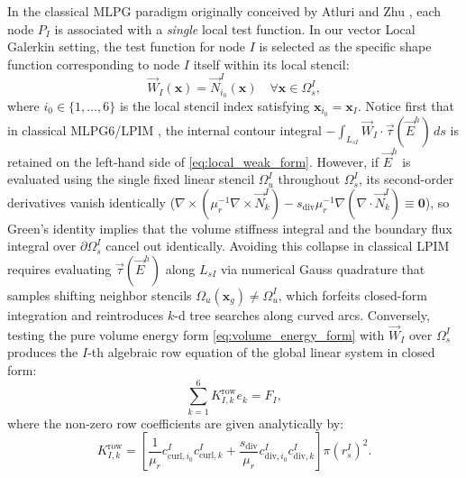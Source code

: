 \documentclass[VANCOUVER,Times1COL]{WileyNJD-v5}
\begin{document}
In the classical MLPG paradigm originally conceived by Atluri and Zhu \cite{atluri1998new, atluri2002meshless}, each node $P_I$ is associated with a \textit{single} local test function. In our vector Local Galerkin setting, the test function for node $I$ is selected as the specific shape function corresponding to node $I$ itself within its local stencil:
\begin{equation}
    \vec{W}_I(\mathbf{x}) = \vec{N}_{i_0}^I(\mathbf{x}) \quad \forall \mathbf{x} \in \Omega_s^I,
    \label{eq:test_function_row}
\end{equation}
where $i_0 \in \{1, \dots, 6\}$ is the local stencil index satisfying $\mathbf{x}_{i_0} = \mathbf{x}_I$. Notice first that in classical MLPG6/LPIM \cite{atluri2002meshless, liu2001local}, the internal contour integral $-\int_{L_{sI}} \vec{W}_I \cdot \vec{\tau}(\vec{E}^h) \, ds$ is retained on the left-hand side of \eqref{eq:local_weak_form}. However, if $\vec{E}^h$ is evaluated using the single fixed linear stencil $\Omega_u^I$ throughout $\Omega_s^I$, its second-order derivatives vanish identically ($\nabla \times (\mu_r^{-1}\nabla \times \vec{N}_k^I) - s_{\mathrm{div}}\mu_r^{-1}\nabla(\nabla \cdot \vec{N}_k^I) \equiv \mathbf{0}$), so Green's identity implies that the volume stiffness integral and the boundary flux integral over $\partial\Omega_s^I$ cancel out identically. Avoiding this collapse in classical LPIM requires evaluating $\vec{\tau}(\vec{E}^h)$ along $L_{sI}$ via numerical Gauss quadrature that samples shifting neighbor stencils $\Omega_u(\mathbf{x}_g) \ne \Omega_u^I$, which forfeits closed-form integration and reintroduces $k$-d tree searches along curved arcs. Conversely, testing the pure volume energy form \eqref{eq:volume_energy_form} with $\vec{W}_I$ over $\Omega_s^I$ produces the $I$-th algebraic row equation of the global linear system in closed form:
\begin{equation}
    \sum_{k=1}^6 K_{I, k}^{\mathrm{row}} e_k = F_I,
\end{equation}
where the non-zero row coefficients are given analytically by:
\begin{equation}
    K_{I, k}^{\mathrm{row}} = \left[ \frac{1}{\mu_r} c_{\mathrm{curl}, i_0}^I c_{\mathrm{curl}, k}^I + \frac{s_{\mathrm{div}}}{\mu_r} c_{\mathrm{div}, i_0}^I c_{\mathrm{div}, k}^I \right] \pi (r_s^I)^2.
    \label{eq:k_row_analytic}
\end{equation}
\end{document}
